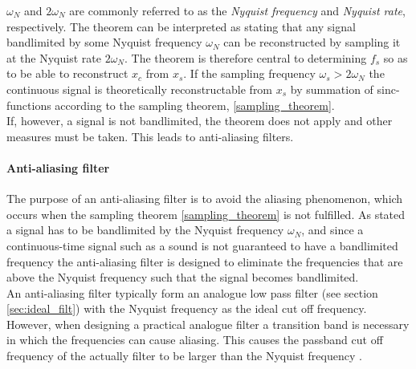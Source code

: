 $\omega_N$ and $2\omega_N$ are commonly referred to as the \textit{Nyquist frequency} and \textit{Nyquist rate}, respectively. The theorem can be interpreted as stating that any signal bandlimited by some Nyquist frequency $\omega_N$ can be reconstructed by sampling it at the Nyquist rate $2\omega_N$. The theorem is therefore central to determining $f_s$ so as to be able to reconstruct $x_c$ from $x_s$. If the sampling frequency $\omega_s>2\omega_N$ the continuous signal is theoretically reconstructable from $x_s$ by summation of sinc-functions according to the sampling theorem, \ref{sampling_theorem}.\\
If, however, a signal is not bandlimited, the theorem does not apply and other measures must be taken. This leads to anti-aliasing filters. 

\paragraph{Anti-aliasing filter}
The purpose of an anti-aliasing filter is to avoid the aliasing phenomenon, which occurs when the sampling theorem \ref{sampling_theorem} is not fulfilled. As stated a signal has to be bandlimited by the Nyquist frequency $\omega_N$, and since a continuous-time signal such as a sound is not guaranteed to have a bandlimited frequency the anti-aliasing filter is designed to eliminate the frequencies that are above the Nyquist frequency such that the signal becomes bandlimited. \\
An anti-aliasing filter typically form an analogue low pass filter (see section \ref{sec:ideal_filt}) with the Nyquist frequency as the ideal cut off frequency. However, when designing a practical analogue filter a transition band is necessary in which the frequencies can cause aliasing. This causes the passband cut off frequency of the actually filter to be larger than the Nyquist frequency .


